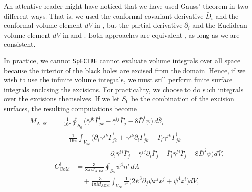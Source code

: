 \documentclass{../document}
\begin{document}
      An attentive reader might have noticed that we have used Gauss' theorem in two different ways. That is, we used the conformal covariant derivative $\bar D_i$ and the conformal volume element $d\bar{V}$ in \eq{\eqref{eq:Madm-Gauss}}, but the partial derivative $\partial_i$ and the Euclidean volume element $dV$ in \eq{\eqref{eq:CoM-Gauss}} and \eq{\eqref{eq:Padm-Gauss}}. Both approaches are equivalent \cite{DeBenedictis_1998, Teukolsky_2016}, as long as we are consistent.
      
      In practice, we cannot {\tt SpECTRE} cannot evaluate volume integrals over all space because the interior of the black holes are excised from the domain. Hence, if we wish to use the infinite volume integrals, we must still perform finite surface integrals enclosing the excisions. For practicality, we choose to do such integrals over the excisions themselves. If we let $S_0$ be the combination of the excision surfaces, the resulting computations become
      \begin{equation} \label{eq:Madm-mixed}
        \begin{aligned}
        M_\text{ADM}
        &= \frac{1}{16\pi} \oint_{S_0}  \Big(
            \bar\gamma^{jk} \bar\Gamma^i_{jk}
            - \bar\gamma^{ij} \bar\Gamma_{j}
            - 8 \bar D^i \psi
            \Big) \, d\bar{S}_i
            \\ &\quad
            + \frac{1}{16\pi}
            \int_{V_\infty} \Big(
              \partial_i \bar\gamma^{jk} \bar\Gamma^i_{jk}
              + \bar\gamma^{jk} \partial_i \bar\Gamma^i_{jk}
              + \bar\Gamma_l \bar\gamma^{jk} \bar\Gamma^l_{jk}
              \\ &\qquad\qquad\qquad\quad
              - \partial_i \bar\gamma^{ij} \bar\Gamma_j
              - \bar\gamma^{ij} \partial_i \bar\Gamma_j
              - \bar\Gamma_l \bar\gamma^{lj} \bar\Gamma_j
              - 8 \bar D^2 \psi
            \Big) d\bar{V},
        \end{aligned}
      \end{equation}
      \begin{equation} \label{eq:CoM-mixed}
        \begin{aligned}
          C_\text{CoM}^i
          &= \frac{3}{8 \pi M_\text{ADM}}
              \oint_{S_0} \psi^4 n^i \, dA
              \\ &\quad
            +\frac{3}{4 \pi M_\text{ADM}}
              \int_{V_\infty} \frac{1}{r^2} \Big(
                2 \psi^3 \partial_j \psi x^i x^j
                + \psi^4 x^i
              \Big) dV,
        \end{aligned}
      \end{equation}
\end{document}
